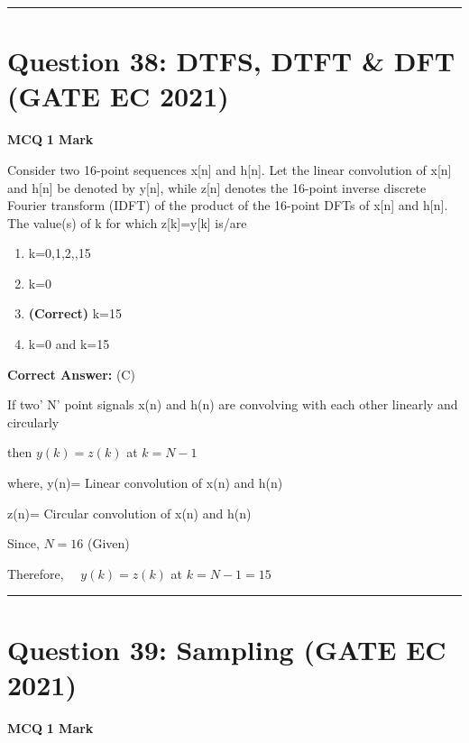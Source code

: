 \documentclass[11pt,a4paper]{article}
\begin{document}
\vspace{1.5em}
\hrule
\vspace{1.5em}

\section*{Question 38: DTFS, DTFT \& DFT (GATE EC 2021)}
\noindent \textbf{\color{primary}MCQ} \hfill \textbf{\color{secondary}1 Mark}


\noindent Consider two 16-point sequences x[n] and h[n]. Let the linear convolution of  x[n] and h[n] be denoted by y[n], while z[n] denotes the 16-point inverse discrete Fourier transform (IDFT) of the product of the 16-point DFTs of x[n] and h[n]. The value(s) of k for which z[k]=y[k] is/are


\begin{enumerate}[label=(\Alph*)]
    \item k=0,1,2,,15
    \item k=0
    \item \textbf{(Correct)} k=15
    \item k=0 and k=15
\end{enumerate}

\noindent \textbf{Correct Answer:} (C)

\begin{tcolorbox}[solbox, title=Detailed Solution -- Question 38]
If two' N' point signals x(n) and h(n) are convolving with each other linearly and circularly

then
$y(k)=z(k)$ at $k=N-1$

where, y(n)= Linear convolution of x(n) and h(n)

z(n)= Circular convolution of x(n) and h(n)

Since, $N=16$ (Given) 

Therefore, $\quad y(k)=z(k)$ at $k=N-1=15$
\end{tcolorbox}

\vspace{1.5em}
\hrule
\vspace{1.5em}

\section*{Question 39: Sampling (GATE EC 2021)}
\noindent \textbf{\color{primary}MCQ} \hfill \textbf{\color{secondary}1 Mark}
\end{document}
